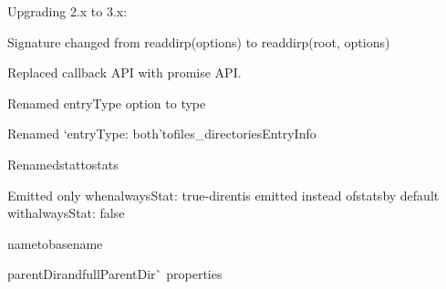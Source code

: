 \begin{DoxyItemize}
\item Upgrading 2.\+x to 3.\+x\+:
\begin{DoxyItemize}
\item Signature changed from {\ttfamily readdirp(options)} to {\ttfamily readdirp(root, options)}
\item Replaced callback A\+PI with promise A\+PI.
\item Renamed {\ttfamily entry\+Type} option to {\ttfamily type}
\item Renamed `entry\+Type\+: \textquotesingle{}both'{\ttfamily to}\textquotesingle{}files\+\_\+directories\textquotesingle{}{\ttfamily  -\/}Entry\+Info{\ttfamily 
\begin{DoxyItemize}
\item Renamedstat{\ttfamily to}stats{\ttfamily 
\begin{DoxyItemize}
\item Emitted only whenalways\+Stat\+: true{\ttfamily  -\/}dirent{\ttfamily is emitted instead of}stats{\ttfamily by default with}always\+Stat\+: false{\ttfamily }
\end{DoxyItemize}}
\item {name{\ttfamily to}basename{\ttfamily }}
\item {parent\+Dir{\ttfamily and}full\+Parent\+Dir\`{} properties}
\end{DoxyItemize}}
\end{DoxyItemize}
\item {}
\end{DoxyItemize}

{}

{\ttfamily {\ttfamily }}

{}

{}